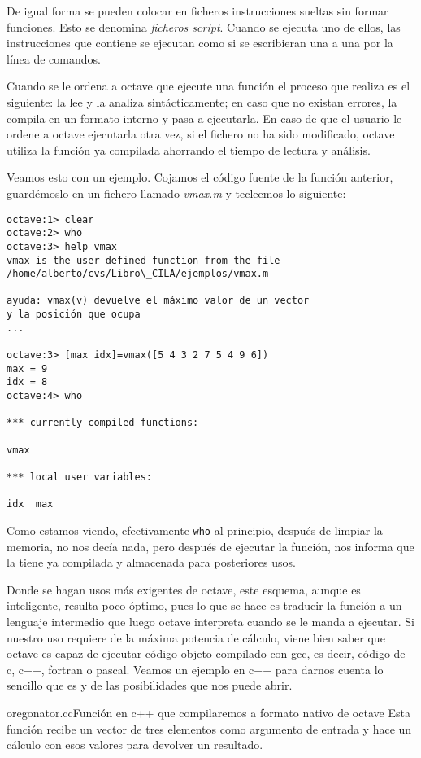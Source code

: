 De igual forma se pueden colocar en ficheros instrucciones sueltas sin
formar funciones.  Esto se denomina  {\em ficheros script}.  Cuando se
ejecuta uno de ellos, las  instrucciones que contiene se ejecutan como
si se escribieran una a una por la línea de comandos.

Cuando se  le ordena a octave  que ejecute una función  el proceso que
realiza es el siguiente: la lee  y la analiza sintácticamente; en caso
que no  existan errores,  la compila  en un formato  interno y  pasa a
ejecutarla. En  caso de que el  usuario le ordene a  octave ejecutarla
otra  vez, si  el fichero  no ha  sido modificado,  octave utiliza  la
función ya compilada ahorrando el tiempo de lectura y análisis.

Veamos esto  con un ejemplo.  Cojamos el  código fuente de  la función
anterior, guardémoslo en  un fichero llamado {\em  vmax.m} y tecleemos
lo siguiente:

\begin{verbatim}
octave:1> clear
octave:2> who
octave:3> help vmax
vmax is the user-defined function from the file
/home/alberto/cvs/Libro\_CILA/ejemplos/vmax.m

ayuda: vmax(v) devuelve el máximo valor de un vector 
y la posición que ocupa
...

octave:3> [max idx]=vmax([5 4 3 2 7 5 4 9 6])
max = 9
idx = 8
octave:4> who

*** currently compiled functions:

vmax

*** local user variables:

idx  max
\end{verbatim}

Como estamos viendo, efectivamente {\tt  who} al principio, después de
limpiar la  memoria, no nos  decía nada,  pero después de  ejecutar la
función,  nos informa  que la  tiene  ya compilada  y almacenada  para
posteriores usos.

Donde se hagan  usos más exigentes de octave, este  esquema, aunque es
inteligente, resulta poco  óptimo, pues lo que se hace  es traducir la
función a un lenguaje intermedio que luego octave interpreta cuando se
le manda a ejecutar. Si nuestro  uso requiere de la máxima potencia de
cálculo,  viene bien  saber que  octave  es capaz  de ejecutar  código
objeto  compilado con  gcc,  es decir,  código de  c,  c++, fortran  o
pascal. Veamos un ejemplo en c++ para darnos cuenta lo sencillo que es
y de las posibilidades que nos puede abrir.

\begin{ejemplo}{oregonator.cc}{Función  en  c++   que  compilaremos  a
formato  nativo de  octave}  Esta  función recibe  un  vector de  tres
elementos como argumento de entrada y hace un cálculo con esos valores
para devolver un resultado. \end{ejemplo}

